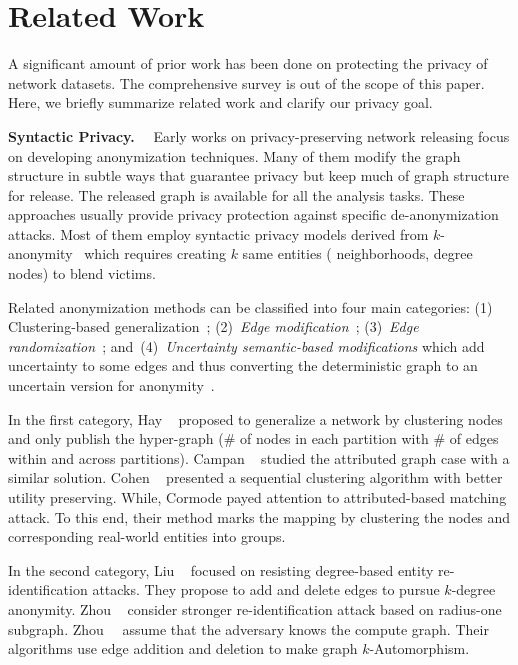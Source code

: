 \section{Related Work}
\label{sec:relatedWork}
A significant amount of prior work has been done on protecting the privacy of network datasets.
The comprehensive survey is out of the scope of this paper. 
Here, we briefly summarize related work and clarify our privacy goal. 

\textbf{Syntactic Privacy.}~~
Early works on privacy-preserving network releasing focus on developing anonymization techniques.
Many of them modify the graph structure in subtle ways that guarantee privacy but keep much of graph structure for release. 
The released graph is available for all the analysis tasks. 
These approaches usually provide privacy protection against specific de-anonymization attacks. 
Most of them employ syntactic privacy models derived from $k$-anonymity~\cite{Sweeney:2002:KAM:774544.774552} which requires creating $k$ same entities ({\eg} neighborhoods, degree nodes) to blend victims. 

Related anonymization methods can be classified into four main categories: (1) Clustering-based generalization~\cite{Hay_Anonymizing_2007,Bhagat_Class_2009,hay2010resisting}; (2)~{\em Edge modification}~\cite{Liu_Towards_2008, Zhou_Preserving_2008, Zou:2009, Wang2011, Wu_k_2010, Skarkala_Privacy_2012}; 
(3)~{\em Edge randomization}~\cite{Liu_Privacy_2009,Ying_Randomizing_2008, Ninggal_Utility_2015};
and~(4)~{\em Uncertainty semantic-based modifications} which add uncertainty to some edges and thus converting the deterministic graph to an uncertain version for anonymity~\cite{Boldi_Injecting_2012, Nguyen_Anonymizing_2015}. 

In the first category, Hay {\etal}~\cite{Hay_Anonymizing_2007} proposed to generalize a network by clustering nodes and only publish the hyper-graph ($\#$ of nodes in each partition with $\#$ of edges within and across partitions). Campan {\etal}~\cite{Campan2008} studied the attributed graph case with a similar solution. 
Cohen {\etal}~\cite{Cohen2013} presented a sequential clustering algorithm with better utility preserving. While, Cormode{\etal} \cite{Bhagat_Class_2009} payed attention to attributed-based matching attack. To this end, their method marks the mapping by clustering the nodes and corresponding real-world entities into groups. 

In the second category, Liu {\etal}~\cite{Liu_Towards_2008} focused on resisting degree-based entity re-identification attacks. They propose to add and delete edges to pursue $k$-degree anonymity. Zhou {\etal}~\cite{Zhou_Preserving_2008} consider stronger re-identification attack based on radius-one subgraph. Zhou~{\etal}~\cite{Zou:2009} assume that the adversary knows the compute graph. Their algorithms use edge addition and deletion to make graph $k$-Automorphism.  

